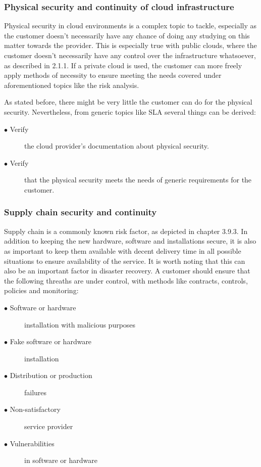 \documentclass{article}
\begin{document}
\subsubsection{Physical security and continuity of cloud infrastructure}
Physical security in cloud environments is a complex topic to tackle, especially as the customer doesn't necessarily have any chance of doing any studying on this matter towards the provider. This is especially true with public clouds, where the customer doesn't necessarily have any control over the infrastructure whatsoever, as described in 2.1.1. If a private cloud is used, the customer can more freely apply methods of necessity to ensure meeting the needs covered under aforementioned topics like the risk analysis.
\par
As stated before, there might be very little the customer can do for the physical security. Nevertheless, from generic topics like SLA several things can be derived:
\begin{description}
	\item[$\bullet$ Verify] the cloud provider's documentation about physical security.
	\item[$\bullet$ Verify] that the physical security meets the needs of generic requirements for the customer.
\end{description}	
 
\subsubsection{Supply chain security and continuity}
Supply chain is a commonly known risk factor, as depicted in chapter 3.9.3. In addition to keeping the new hardware, software and installations secure, it is also as important to keep them available with decent delivery time in all possible situations to ensure availability of the service. It is worth noting that this can also be an important factor in disaster recovery. A customer should ensure that the following threaths are under control, with methods like contracts, controls, policies and monitoring:
\begin{description}
	\item[$\bullet$ Software or hardware] installation with malicious purposes 
	\item[$\bullet$ Fake software or hardware] installation
	\item[$\bullet$ Distribution or production] failures
	\item[$\bullet$ Non-satisfactory] service provider
	\item[$\bullet$ Vulnerabilities] in software or hardware
\end{description}
\end{document}
